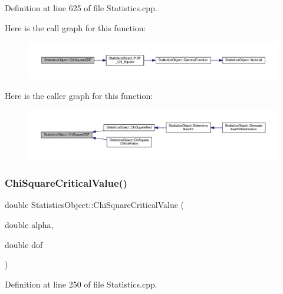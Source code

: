 Definition at line 625 of file Statistics.\+cpp.

Here is the call graph for this function\+:
\nopagebreak
\begin{figure}[H]
\begin{center}
\leavevmode
\includegraphics[width=350pt]{class_statistics_object_a7ad5fc88ce637ed421f4fccf92a8b5e0_cgraph}
\end{center}
\end{figure}
Here is the caller graph for this function\+:
\nopagebreak
\begin{figure}[H]
\begin{center}
\leavevmode
\includegraphics[width=350pt]{class_statistics_object_a7ad5fc88ce637ed421f4fccf92a8b5e0_icgraph}
\end{center}
\end{figure}
\mbox{\label{class_statistics_object_aa4d91e7d45164eb8a3849c1c7df585e1}} 
\subsubsection{\texorpdfstring{Chi\+Square\+Critical\+Value()}{ChiSquareCriticalValue()}}
{\footnotesize\ttfamily double Statistics\+Object\+::\+Chi\+Square\+Critical\+Value (\begin{DoxyParamCaption}\item[{double}]{alpha,  }\item[{double}]{dof }\end{DoxyParamCaption})}



Definition at line 250 of file Statistics.\+cpp.

